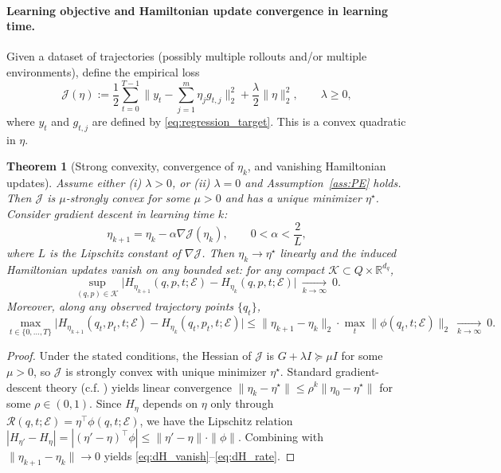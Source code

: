 \documentclass{article} %
\newtheorem{theorem}{Theorem}[section]     %
\begin{document}
\paragraph{Learning objective and Hamiltonian update convergence in learning time.}
Given a dataset of trajectories (possibly multiple rollouts and/or multiple environments), define the empirical loss
\begin{equation}
\label{eq:ls_loss_eta}
\mathcal J(\eta)
:=\frac12\sum_{t=0}^{T-1}\big\|y_t-\sum_{j=1}^m \eta_j g_{t,j}\big\|_2^2
+\frac{\lambda}{2}\|\eta\|_2^2,
\qquad \lambda\ge 0,
\end{equation}
where $y_t$ and $g_{t,j}$ are defined by \cref{eq:regression_target}. This is a convex quadratic in $\eta$.

\begin{theorem}[Strong convexity, convergence of $\eta_k$, and vanishing Hamiltonian updates]
\label{thm:eta_convergence_dH}
Assume either (i) $\lambda>0$, or (ii) $\lambda=0$ and Assumption~\ref{ass:PE} holds.
Then $\mathcal J$ is $\mu$-strongly convex for some $\mu>0$ and has a unique minimizer $\eta^\star$.
Consider gradient descent in learning time $k$:
\[
\eta_{k+1}=\eta_k-\alpha\nabla \mathcal J(\eta_k),
\qquad 0<\alpha<\frac{2}{L},
\]
where $L$ is the Lipschitz constant of $\nabla\mathcal J$.
Then $\eta_k\to\eta^\star$ linearly and the induced Hamiltonian updates vanish on any bounded set:
for any compact $\mathcal K\subset Q\times \mathbb R^{d_q}$,
\begin{equation}
\label{eq:dH_vanish}
\sup_{(q,p)\in\mathcal K}\big|H_{\eta_{k+1}}(q,p,t;\mathcal E)-H_{\eta_k}(q,p,t;\mathcal E)\big|
\ \xrightarrow[k\to\infty]{}\ 0.
\end{equation}
Moreover, along any observed trajectory points $\{q_t\}$,
\begin{equation}
\label{eq:dH_rate}
\max_{t\in\{0,\dots,T\}}\big|H_{\eta_{k+1}}(q_t,p_t,t;\mathcal E)-H_{\eta_k}(q_t,p_t,t;\mathcal E)\big|
\le \|\eta_{k+1}-\eta_k\|_2 \cdot \max_t \|\phi(q_t,t;\mathcal E)\|_2
\ \xrightarrow[k\to\infty]{}\ 0.
\end{equation}
\end{theorem}

\begin{proof}
Under the stated conditions, the Hessian of $\mathcal J$ is $G+\lambda I\succeq \mu I$ for some $\mu>0$,
so $\mathcal J$ is strongly convex with unique minimizer $\eta^\star$. Standard gradient-descent theory (c.f. \citet{NocedalWright2006NumericalOptimization}) yields linear convergence
$\|\eta_k-\eta^\star\|\le \rho^k\|\eta_0-\eta^\star\|$ for some $\rho\in(0,1)$.
Since $H_\eta$ depends on $\eta$ only through $\mathcal R(q,t;\mathcal E)=\eta^\top\phi(q,t;\mathcal E)$,
we have the Lipschitz relation
$|H_{\eta'}-H_\eta|=|(\eta'-\eta)^\top\phi|\le \|\eta'-\eta\|\cdot \|\phi\|$.
Combining with $\|\eta_{k+1}-\eta_k\|\to 0$ yields \cref{eq:dH_vanish}--\cref{eq:dH_rate}.
\end{proof}
\end{document}
